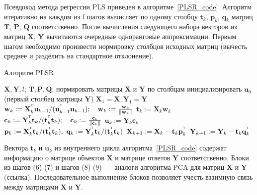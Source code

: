 \documentclass[12pt,twoside]{article}
\newcommand{\bw}{\mathbf{w}}
\newcommand{\bY}{\mathbf{Y}}
\newcommand{\bX}{\mathbf{X}}
\newcommand{\bu}{\mathbf{u}}
\newcommand{\bt}{\mathbf{t}}
\newcommand{\bp}{\mathbf{p}}
\newcommand{\bq}{\mathbf{q}}
\newcommand{\bc}{\mathbf{c}}
\newcommand{\bP}{\mathbf{P}}
\newcommand{\bT}{\mathbf{T}}
\newcommand{\bQ}{\mathbf{Q}}
\newcommand{\T}{^{\text{\tiny\sffamily\upshape\mdseries T}}}
\begin{document}
Псевдокод метода регрессии PLS приведен в алгоритме~\ref{PLSR_code}.
Алгоритм итеративно на каждом из $l$ шагов вычисляет по одному столбцу $\bt_k$, $\bp_k$, $\bq_k$ матриц $\bT$, $\bP$, $\bQ$ соответственно. После вычисления следующего набора векторов из матриц $\bX$, $\bY$ вычитаются очередные одноранговые аппроксимации. 
Первым шагом необходимо произвести нормировку столбцов исходных матриц (вычесть среднее и разделить на стандартное отклонение).

\begin{algorithm}[h]
\caption{Алгоритм PLSR}
\label{PLSR_code}
\begin{algorithmic}[1]
	\REQUIRE $\bX, \bY, l$;
	\ENSURE $\bT, \bP, \bQ$;
	\STATE нормировать матрицы $\bX$ и $\bY$ по столбцам
	\STATE инициализировать $\bu_0$ (первый столбец матрицы $\bY$)
	\STATE $\bX_1 = \bX; \bY_1 = \bY$
	\REPEAT
	\vspace{0.1cm}
	\STATE $\bw_k := \bX_k^{\T} \bu_{k-1} / (\bu_{k-1}^{\T} \bu_{k-1}); \quad \bw_k: = \frac{\bw_k}{\| \bw_k \|}$
	\vspace{0.1cm}
	\STATE $\bt_k := \bX_k \bw_k$
	\vspace{0.1cm}
	\STATE $\bc_k := \bY_k^{\T} \bt_k / (\bt_k^{\T} \bt_k); \quad \bc_k: = \frac{\bc_k}{\| \bc_k \|}$
	\vspace{0.1cm}
	\STATE $\bu_k := \bY_k \bc_k$
	\UNTIL{$\bt_k$ не стабилизируется}
	\vspace{0.1cm}
	\STATE $\bp_k:= \bX_k^{\T}\bt_k/(\bt_k^{\T}\bt_k),\ 
	\bq_k := \bY_k^{\T}\bt_k/(\bt_k^{\T}\bt_k)$
	\vspace{0.2cm}
	\STATE $\bX_{k+1} :=  \bX_k - \bt_k \bp_k^{\T}$
	\vspace{0.2cm}
	\STATE $\bY_{k + 1} :=  \bY_k - \bt_k \bq_k^{\T}$ 
	\ENDFOR
\end{algorithmic}
\end{algorithm}
Вектора $\bt_k$ и $\bu_k$ из внутреннего цикла алгоритма~\ref{PLSR_code}
содержат информацию о матрице объектов $\bX$ и матрице ответов $\bY$ соответственно. 
Блоки из шагов (6)-(7) и шагов (8)-(9)~--- аналоги алгоритма PCA для матриц $\bX$ и $\bY$ (ссылка). Последовательное выполнение блоков позволяет учесть взаимную связь между матрицами $\bX$ и $\bY$.
\end{document}

